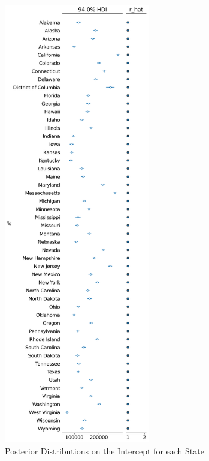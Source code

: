 \documentclass[11pt]{amsart}
\begin{document}
\begin{figure}[htbp]
    \centering
    \begin{minipage}{0.5\linewidth}
        \centering
        \includegraphics[width=2.5in]{figures/intercept_forst.png}
        \caption{Posterior Distributions on the Intercept for each State}
        \label{fig:intercept_forest}
    \end{minipage}\hfill
    \begin{minipage}{0.5\linewidth}
        \centering

\end{minipage}
\end{figure}
\end{document}
